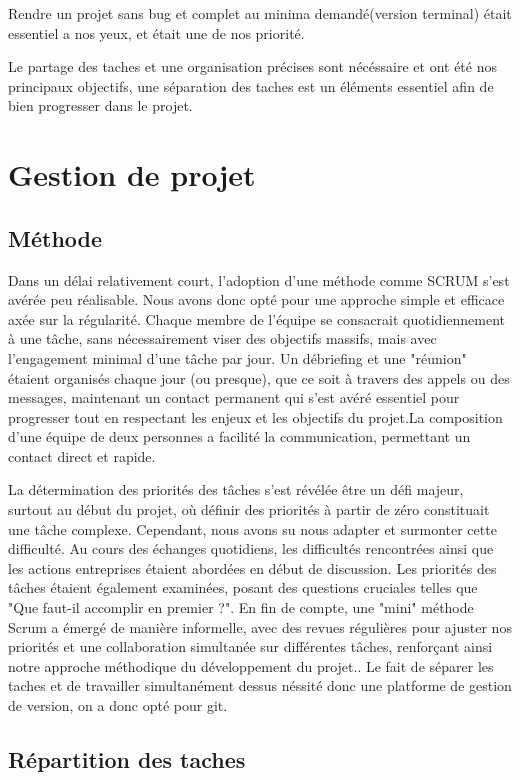 \documentclass{article}
\begin{document}
Rendre un projet sans bug et complet au minima demandé(version terminal) était essentiel a nos yeux, et était une de nos priorité.

Le partage des taches et une organisation précises sont nécéssaire et ont été nos principaux objectifs, une séparation des taches est un éléments essentiel afin de bien progresser dans le projet.

\section{Gestion de projet}

\subsection{Méthode}

Dans un délai relativement court, l'adoption d'une méthode comme SCRUM s'est avérée peu réalisable. Nous avons donc opté pour une approche simple et efficace axée sur la régularité. Chaque membre de l'équipe se consacrait quotidiennement à une tâche, sans nécessairement viser des objectifs massifs, mais avec l'engagement minimal d'une tâche par jour. Un débriefing et une "réunion" étaient organisés chaque jour (ou presque), que ce soit à travers des appels ou des messages, maintenant un contact permanent qui s'est avéré essentiel pour progresser tout en respectant les enjeux et les objectifs du projet.La composition d'une équipe de deux personnes a facilité la communication, permettant un contact direct et rapide. 

La détermination des priorités des tâches s'est révélée être un défi majeur, surtout au début du projet, où définir des priorités à partir de zéro constituait une tâche complexe. Cependant, nous avons su nous adapter et surmonter cette difficulté. Au cours des échanges quotidiens, les difficultés rencontrées ainsi que les actions entreprises étaient abordées en début de discussion. Les priorités des tâches étaient également examinées, posant des questions cruciales telles que "Que faut-il accomplir en premier ?". En fin de compte, une "mini" méthode Scrum a émergé de manière informelle, avec des revues régulières pour ajuster nos priorités et une collaboration simultanée sur différentes tâches, renforçant ainsi notre approche méthodique du développement du projet.. Le fait de séparer les taches et de travailler simultanément dessus néssité donc une platforme de gestion de version, on a donc opté pour git.


\subsection{Répartition des taches}
\end{document}
